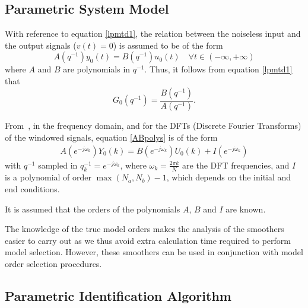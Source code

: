 \subsection{Parametric System Model}

With reference to equation \eqref{lpmtd1}, the relation between the noiseless input and the output signals ($v(t)= 0$) is assumed to be of the form
\begin{equation}
    A(q^{-1}) y_0(t) = B(q^{-1}) u_0(t) \quad \forall t \in \left( - \infty, + \infty \right)
\label{ABpolys}
\end{equation}
where $A$ and $B$ are polynomials in $q^{-1}$. Thus, it follows from equation \eqref{lpmtd1} that
\begin{equation}
    G_0(q^{-1})= \frac{B(q^{-1})}{A(q^{-1})}
    \text{.}
\end{equation}

From~\citep[Section 6.3.2.]{Pintelon2012}, in the frequency domain, and for the DFTs (Discrete Fourier Transforms) of the windowed signals, equation \eqref{ABpolys} is of the form
\begin{align}
A(e^{-j\omega_k})Y_0(k) = B(e^{-j\omega_k})U_0(k) + I(e^{-j\omega_k})
\label{DFTspectra}
\end{align}
with $q^{-1}$ sampled in  $q_k^{-1} = e^{-j\omega_k}$, where $\omega_k = \frac{2\pi k}{N}$ are the DFT frequencies, and $I$ is a polynomial of order $\max(N_a,N_b) - 1$, which depends on the initial and end conditions. 
\begin{assumption}
It is assumed that the orders of the polynomials $A$, $B$ and $I$ are known.
\end{assumption}

\begin{remark}
The knowledge of the true model orders makes the analysis of the smoothers easier to carry out as we thus avoid extra calculation time required to perform model selection.
However, these smoothers can be used in conjunction with model order selection procedures.
\end{remark}

\subsection{Parametric Identification Algorithm}\label{se:paramIdentAlgo}


